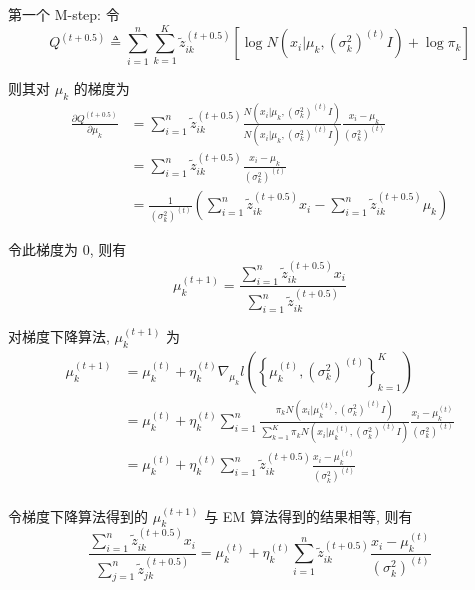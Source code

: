 \documentclass[openany]{ctexbook}
\theoremstyle{kaiti}
\theoremstyle{normal}
\begin{document}
第一个 M-step: 令
\begin{equation}
    Q^{(t+0.5)}\triangleq\sum_{i=1}^n\sum_{k=1}^K \tilde{z}_{ik}^{(t+0.5)} \left[\log N\left(x_i\Big|\mu_k,(\sigma_k^2)^{(t)}I\right)+\log\pi_k\right]
\end{equation}

则其对 $\mu_k$ 的梯度为
\begin{equation}
  \begin{aligned}
    \frac{\partial Q^{(t+0.5)}}{\partial \mu_k}
    &=\sum_{i=1}^n\tilde{z}_{ik}^{(t+0.5)}\frac{N\left(x_i\Big|\mu_k,(\sigma_k^2)^{(t)}I\right)}{N\left(x_i\Big|\mu_k,(\sigma_k^2)^{(t)}I\right)}\frac{x_i-\mu_k}{(\sigma_k^2)^{(t)}}\\
    &=\sum_{i=1}^n\tilde{z}_{ik}^{(t+0.5)}\frac{x_i-\mu_k}{(\sigma_k^2)^{(t)}}\\
    &=\frac{1}{(\sigma_k^2)^{(t)}}\left(\sum_{i=1}^n\tilde{z}_{ik}^{(t+0.5)}x_i-\sum_{i=1}^n\tilde{z}_{ik}^{(t+0.5)}\mu_k\right)
  \end{aligned}
\end{equation}

令此梯度为 0, 则有
\begin{equation}
  \mu_k^{(t+1)}=\frac{\displaystyle\sum_{i=1}^n\tilde{z}_{ik}^{(t+0.5)}x_i}{\displaystyle\sum_{i=1}^n\tilde{z}_{ik}^{(t+0.5)}}
\end{equation}

对梯度下降算法, $\mu_k^{(t+1)}$ 为
\begin{equation}
  \begin{aligned}
    \mu_k^{(t+1)}
    &=\mu_k^{(t)}+\eta_k^{(t)}\nabla_{\mu_k}l\left(\left\{\mu_k^{(t)},(\sigma_k ^2)^{(t)}\right\}_{k=1}^K\right)\\
    &=\mu_k^{(t)}+\eta_k^{(t)}\sum_{i=1}^n\frac{\pi_k N\left(x_i\Big|\mu_k^{(t)},(\sigma_k^2)^{(t)}I\right)}{\displaystyle\sum_{k=1}^K\pi_k N\left(x_i\Big|\mu_k^{(t)},(\sigma_k^2)^{(t)}I\right)}\frac{x_i-\mu_k^{(t)}}{(\sigma_k ^2)^{(t)}}\\
    &=\mu_k^{(t)}+\eta_k^{(t)}\sum_{i=1}^n\tilde{z}_{ik}^{(t+0.5)}\frac{x_i-\mu_k^{(t)}}{(\sigma_k ^2)^{(t)}}\\
  \end{aligned}
\end{equation}

令梯度下降算法得到的 $\mu_k^{(t+1)}$ 与 EM 算法得到的结果相等, 则有
\begin{equation}
  \frac{\displaystyle\sum_{i=1}^n\tilde{z}_{ik}^{(t+0.5)}x_i}{\displaystyle\sum_{j=1}^n\tilde{z}_{jk}^{(t+0.5)}}
  =\mu_k^{(t)}+\eta_k^{(t)}\sum_{i=1}^n\tilde{z}_{ik}^{(t+0.5)}\frac{x_i-\mu_k^{(t)}}{(\sigma_k ^2)^{(t)}}
\end{equation}
\end{document}
